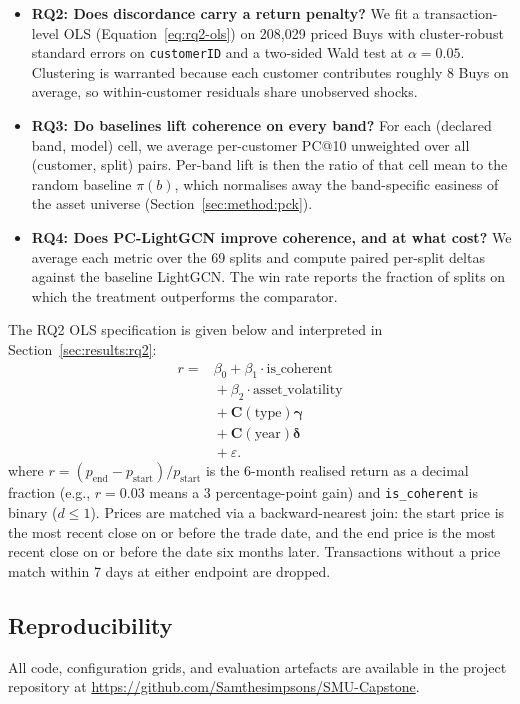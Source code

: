 \begin{itemize}
    \item \textbf{RQ2: Does discordance carry a return penalty?} We fit a transaction-level OLS (Equation~\ref{eq:rq2-ols}) on 208{,}029 priced Buys with cluster-robust standard errors on \texttt{customerID} and a two-sided Wald test at $\alpha = 0.05$. Clustering is warranted because each customer contributes roughly 8 Buys on average, so within-customer residuals share unobserved shocks.
    \item \textbf{RQ3: Do baselines lift coherence on every band?} For each (declared band, model) cell, we average per-customer PC@10 unweighted over all (customer, split) pairs. Per-band lift is then the ratio of that cell mean to the random baseline $\pi(b)$, which normalises away the band-specific easiness of the asset universe (Section~\ref{sec:method:pck}).
    \item \textbf{RQ4: Does PC-LightGCN improve coherence, and at what cost?} We average each metric over the 69 splits and compute paired per-split deltas against the baseline LightGCN. The win rate reports the fraction of splits on which the treatment outperforms the comparator.
\end{itemize}

The RQ2 OLS specification is given below and interpreted in Section~\ref{sec:results:rq2}:
\begin{equation}
\label{eq:rq2-ols}
\begin{split}
r ={}& \beta_0 + \beta_1 \cdot \text{is\_coherent} \\
    &{}+ \beta_2 \cdot \text{asset\_volatility} \\
    &{}+ \mathbf{C}(\text{type})\boldsymbol{\gamma} \\
    &{}+ \mathbf{C}(\text{year})\boldsymbol{\delta} \\
    &{}+ \varepsilon.
\end{split}
\end{equation}
where $r = (p_{\text{end}} - p_{\text{start}})/p_{\text{start}}$ is the 6-month realised return as a decimal fraction (e.g., $r = 0.03$ means a 3 percentage-point gain) and \texttt{is\_coherent} is binary ($d \leq 1$). Prices are matched via a backward-nearest join: the start price is the most recent close on or before the trade date, and the end price is the most recent close on or before the date six months later. Transactions without a price match within 7 days at either endpoint are dropped.

\subsection{Reproducibility}
\label{sec:setup:reproducibility}

All code, configuration grids, and evaluation artefacts are available in the project repository at \url{https://github.com/Samthesimpsons/SMU-Capstone}.
